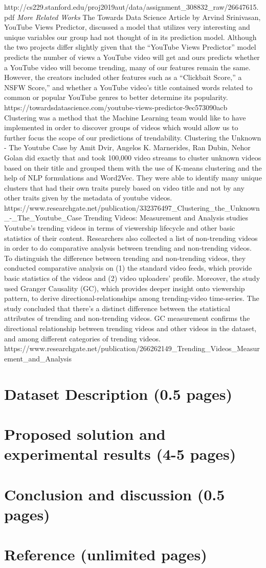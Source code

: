 \documentclass{article}
\begin{document}
 http://cs229.stanford.edu/proj2019aut/data/assignment_308832_raw/26647615.pdf
\textit{More Related Works}
The Towards Data Science Article by Arvind Srinivasan, YouTube Views Predictor, discussed a model that utilizes very interesting and unique variables our group had not thought of in its prediction model. Although the two projects differ slightly given that the “YouTube Views Predictor” model predicts the number of views a YouTube video will get and ours predicts whether a YouTube video will become trending, many of our features remain the same. However, the creators included other features such as a “Clickbait Score,” a NSFW Score,” and whether a YouTube video’s title contained words related to common or popular YouTube genres to better determine its popularity.  
https://towardsdatascience.com/youtube-views-predictor-9ec573090acb
Clustering was a method that the Machine Learning team would like to have implemented in order to discover groups of videos which would allow us to further focus the scope of our predictions of trendability. Clustering the Unknown - The Youtube Case by Amit Dvir, Angelos K. Marnerides, Ran Dubin, Nehor Golan did exactly that and took 100,000 video streams to cluster unknown videos based on their title and grouped them with the use of K-means clustering and the help of NLP formulations and Word2Vec. They were able to identify many unique clusters that had their own traits purely based on video title and not by any other traits given by the metadata of youtube videos.
https://www.researchgate.net/publication/332376497_Clustering_the_Unknown_-_The_Youtube_Case
Trending Videos: Measurement and Analysis studies Youtube’s trending videos in terms of viewership lifecycle and other basic statistics of their content. Researchers also collected a list of non-trending videos in order to do comparative analysis between trending and non-trending videos. To distinguish the difference between trending and non-trending videos, they conducted comparative analysis on (1) the standard video feeds, which provide basic statistics of the videos and (2) video uploaders’ profile. Moreover, the study used Granger Causality (GC), which provides deeper insight onto viewership pattern, to derive directional-relationships among trending-video time-series. The study concluded that there’s a distinct difference between the statistical attributes of trending and non-trending videos. GC measurement confirms the directional relationship between trending videos and other videos in the dataset, and among different categories of trending videos.
https://www.researchgate.net/publication/266262149_Trending_Videos_Measurement_and_Analysis

\section*{Dataset Description (0.5 pages)}
\section*{Proposed solution and experimental results (4-5 pages)}
\section*{Conclusion and discussion (0.5 pages)}
\section*{Reference (unlimited pages)}
\end{document}
